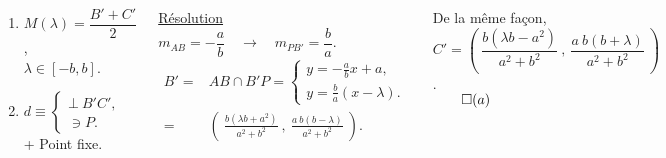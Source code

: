 \documentclass[10pt]{beamer}
\begin{document}
{\begin{columns}[t]
\begin{tcolorbox}[basic]
\begin{enumerate}
					\item $M(\lambda)=\dfrac{B' + C'}{2}$,\\ \smallskip $\lambda \in[-b,b]$. \\[0.6em]
				    
					\item $d\equiv      \begin{cases} 
							    \bot\ B'C', \\
							    \ni P.
							    \end{cases}$ \\ \smallskip
							    + Point fixe.  
				      \end{enumerate}

				    
				    \end{tcolorbox}
		
		
		\centering
		\underline{Résolution}\\ \flushleft
		$m_{AB} = -\dfrac{a}{b} \quad \rightarrow \quad m_{PB'}=\dfrac{b}{a}$. \\ \medskip
		\begin{align*}
		B'=&AB \cap B'P= \begin{cases}
		                  y = -\frac{a}{b}x + a, \\
		                  y = \frac{b}{a}(x-\lambda).
		                  \end{cases} \\
		  =&(\ \frac{b(\lambda b+a^2)}{a^2 + b^2}\ ,\ \frac{a\ b(b-\lambda)}{a^2 + b^2}\ ).
		\end{align*} \smallskip
		
		
		De la même façon, \\ \medskip
		$C'=(\ \dfrac{b(\lambda b-a^2)}{a^2 + b^2}\ ,\ \dfrac{a\ b(b+\lambda)}{a^2 + b^2}\ )$. \\ \smallskip \hfill $\qed(a)$
		

\end{columns}}
\end{document}
